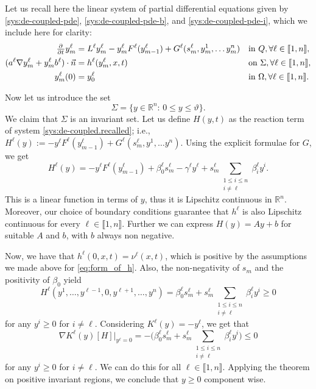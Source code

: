 \documentclass[11pt]{article}
\newcommand{\R}{\mathbb{R}}
\newcommand{\llb}{\llbracket}
\newcommand{\rrb}{\rrbracket}
\begin{document}
Let us recall here the linear system of partial differential equations given by \eqref{sys:de-coupled-pde}, \eqref{sys:de-coupled-pde-b}, and \eqref{sys:de-coupled-pde-i}, which we include here for clarity:
\begin{subequations}
\label{sys:de-coupled.recalled}
\begin{align}
	\pd{ }{t} y_m^\ell &= L^\ell y_m^\ell - y^\ell_m F^\ell(y_{m-1}^\ell) + G^\ell(s_m^\ell,y_{m}^1,\ldots y_{m}^n) 		&& \text{in } Q, \forall \ell \in \llb 1,n\rrb,
	\label{sys:de-coupled-pde.recalled}
	\\
	 (a^\ell  \nabla y_m^\ell + y_m^\ell b^\ell) \cdot \vec{n} &= h^\ell (y_{m}^\ell,x, t)	&& \text{on } \Sigma,\forall \ell \in \llb 1,n\rrb,
	 \label{sys:de-coupled-pde-b.recalled}
	 \\
	 y_m^\ell(0) &= y^\ell_{0}			 && \text{in } \Omega, \forall \ell \in \llb 1,n\rrb.
	 \label{sys:de-coupled-pde-i.recalled}
\end{align}
\end{subequations}

Now let us introduce the set 
\[
	\Sigma  = \big\{ y \in \R^n :\, 0 \leq y \leq \vartheta  \big\}.
\]
We claim that \(\Sigma\) is an invariant set. 
Let us define \(H(y,t)\) as the reaction term of system \eqref{sys:de-coupled.recalled}; i.e., \( H^\ell (y) := - y^\ell F^\ell(y_{m-1}^\ell) + G^\ell(s_m^\ell, y^1,\ldots y^n) \). Using the explicit formulae for \(G\), we get
\[
	H^\ell (y) = -y^\ell F^\ell(y_{m-1}^\ell) + \beta_0^\ell s_m^\ell - \gamma^\ell y^\ell + s_m^\ell \sum_{\substack{1\le i\le n\\ i\neq \ell}} \beta_i^\ell y^i.
\]
This is a linear function in terms of \(y\), thus it is Lipschitz continuous in \(\R^n\). Moreover, our choice of boundary conditions guarantee that \(h^\ell\) is also Lipschitz continuous for every \(\ell \in \llb 1, n\rrb\). Further we can express \(H (y) = Ay + b\) for suitable \(A\) and \(b\), with \(b\) always non negative.

Now, we have that \( h^\ell (0,x, t) = \nu^\ell (x,t) \), which is positive by the assumptions we made above for \eqref{eq:form_of_h}. Also, the non-negativity of \(s_m\) and the positivity of \(\beta_0\) yield
\begin{equation}
\label{ev:at_zero_for_ell}
	H^\ell( y^1, \ldots, y^{\ell-1}, 0, y^{\ell+1}, \ldots, y^n ) = 
	\beta_0^\ell s_m^\ell + s_m^\ell \sum_{\substack{1\le i\le n\\ i\neq \ell}}   \beta_i^\ell  y^i \geq 0
\end{equation}
for any \(y^i\geq 0\) for \(i\neq \ell\).
Considering \(K^\ell(y) = -y^\ell\), we get that 
\[
	\nabla K^\ell(y)[H] \big|_{y^\ell = 0} = - \big( \beta_0^\ell s_m^\ell + s_m^\ell \sum_{\substack{1\le i\le n\\ i\neq \ell}}   \beta_i^\ell  y^i \big) \leq 0
\]
for any \(y^i\geq 0\) for \(i\neq \ell\). We can do this for all \(\ell \in \llb 1,n\rrb\). 
Applying the theorem on positive invariant regions, we conclude that \( y\geq 0\) component wise. 
\end{document}
